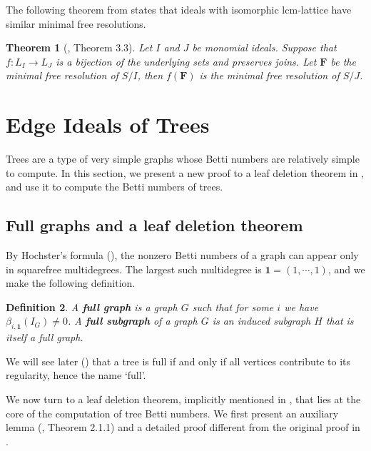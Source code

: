 \documentclass[dvipsnames,10pt]{article}
\newtheorem{theorem}{Theorem}[section]
\newtheorem{defi}[theorem]{Definition}
\begin{document}
The following theorem from \cite{welker1999lcm} states that ideals with isomorphic lcm-lattice have similar minimal free resolutions.

\begin{theorem}[\cite{welker1999lcm}, Theorem 3.3]
    Let $I$ and $J$ be monomial ideals. Suppose that $f:L_I\to L_J$ is a bijection of the underlying sets and preserves joins. Let $\mathbf{F}$ be the minimal free resolution of $S/I$, then $f(\mathbf{F})$ is the minimal free resolution of $S/J$.
\end{theorem}

\section{Edge Ideals of Trees}

Trees are a type of very simple graphs whose Betti numbers are relatively simple to compute. In this section, we present a new proof to a leaf deletion theorem in \cite{bouchat}, and use it to compute the Betti numbers of trees.

\subsection{Full graphs and a leaf deletion theorem}

By Hochster's formula (), the nonzero Betti numbers of a graph can appear only in squarefree multidegrees. The largest such multidegree is $\mathbf{1}=(1,\cdots,1)$, and we make the following definition.
\begin{defi}
    A \textbf{full graph} is a graph $G$ such that for some $i$ we have $\beta_{i,\mathbf{1}}(I_G)\neq 0$. A \textbf{full subgraph} of a graph $G$ is an induced subgraph $H$ that is itself a full graph.
\end{defi}
We will see later () that a tree is full if and only if all vertices contribute to its regularity, hence the name `full'.

We now turn to a leaf deletion theorem, implicitly mentioned in \cite{bouchat}, that lies at the core of the computation of tree Betti numbers. We first present an auxiliary lemma (\cite{bouchat}, Theorem 2.1.1) and a detailed proof different from the original proof in \cite{bouchat}.
\end{document}
